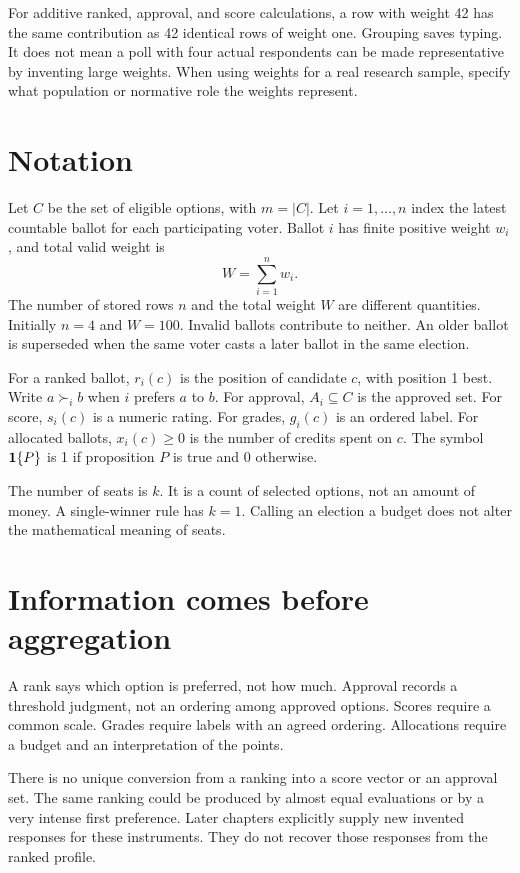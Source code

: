 For additive ranked, approval, and score calculations, a row with weight 42 has the same contribution as 42 identical rows of weight one. Grouping saves typing. It does not mean a poll with four actual respondents can be made representative by inventing large weights. When using weights for a real research sample, specify what population or normative role the weights represent.

\section{Notation}
Let $C$ be the set of eligible options, with $m=|C|$. Let $i=1,\ldots,n$ index the latest countable ballot for each participating voter. Ballot $i$ has finite positive weight $w_i$, and total valid weight is
\[
W=\sum_{i=1}^n w_i.
\]
The number of stored rows $n$ and the total weight $W$ are different quantities. Initially $n=4$ and $W=100$. Invalid ballots contribute to neither. An older ballot is superseded when the same voter casts a later ballot in the same election.

For a ranked ballot, $r_i(c)$ is the position of candidate $c$, with position 1 best. Write $a\succ_i b$ when $i$ prefers $a$ to $b$. For approval, $A_i\subseteq C$ is the approved set. For score, $s_i(c)$ is a numeric rating. For grades, $g_i(c)$ is an ordered label. For allocated ballots, $x_i(c)\geq0$ is the number of credits spent on $c$. The symbol $\mathbf{1}\{P\}$ is 1 if proposition $P$ is true and 0 otherwise.

The number of seats is $k$. It is a count of selected options, not an amount of money. A single-winner rule has $k=1$. Calling an election a budget does not alter the mathematical meaning of seats.

\section{Information comes before aggregation}
A rank says which option is preferred, not how much. Approval records a threshold judgment, not an ordering among approved options. Scores require a common scale. Grades require labels with an agreed ordering. Allocations require a budget and an interpretation of the points.

There is no unique conversion from a ranking into a score vector or an approval set. The same ranking could be produced by almost equal evaluations or by a very intense first preference. Later chapters explicitly supply new invented responses for these instruments. They do not recover those responses from the ranked profile.

